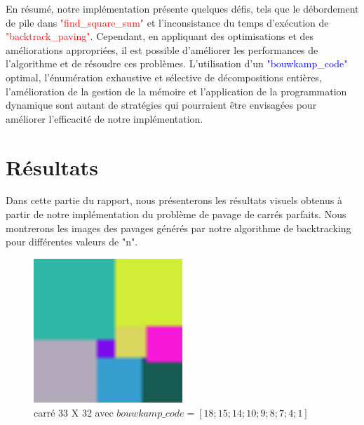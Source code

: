 \documentclass{article}
\begin{document}
En résumé, notre implémentation présente quelques défis, tels que le débordement de pile dans \textcolor{red}{"find\_square\_sum"} et l'inconsistance du temps d'exécution de \textcolor{red}{"backtrack\_paving"}. Cependant, en appliquant des optimisations et des améliorations appropriées, il est possible d'améliorer les performances de l'algorithme et de résoudre ces problèmes. L'utilisation d'un \textcolor{blue}{"bouwkamp\_code"} optimal, l'énumération exhaustive et sélective de décompositions entières, l'amélioration de la gestion de la mémoire et l'application de la programmation dynamique sont autant de stratégies qui pourraient être envisagées pour améliorer l'efficacité de notre implémentation.





\section{Résultats }

Dans cette partie du rapport, nous présenterons les résultats visuels obtenus à partir de notre implémentation du problème de pavage de carrés parfaits. Nous montrerons les images des pavages générés par notre algorithme de backtracking pour différentes valeurs de "n".

\begin{figure}[htbp]
  \centering
  
  \includegraphics[width=0.5\textwidth]{image/32-33.png}
  \caption{carré 33 X 32 avec $bouwkamp\_code = [18;15;14;10;9;8;7;4;1]$}
  \label{fig5}

\end{figure}
\end{document}
